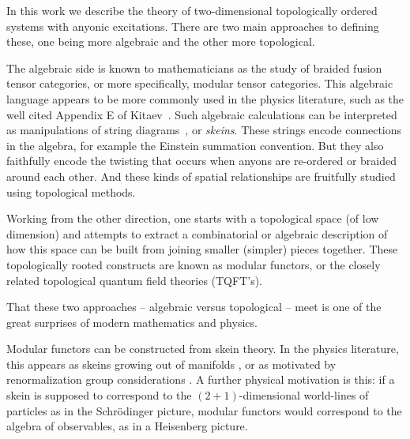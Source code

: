 \documentclass[aps, tightenlines, letterpaper, onecolumn, superscriptaddress, notitlepage, 11pt, groupedaddress]{revtex4-1}
\begin{document}
%
%



In this work we describe the theory of two-dimensional topologically ordered systems
with anyonic excitations. 
There are two main approaches to defining these,
one being more algebraic and the other more topological.

The algebraic side is known to mathematicians as the study of braided
fusion tensor categories, or more specifically, modular tensor categories.
This algebraic language appears to be more commonly used 
in the physics literature, such as the well cited Appendix E of Kitaev~\cite{Kitaev2006}.
Such algebraic calculations can be interpreted as
manipulations of string diagrams~\cite{Baez2010},
or \emph{skeins}.
These strings encode connections in the algebra, for example 
the Einstein summation convention. But they also faithfully
encode the twisting that occurs when anyons are re-ordered or
braided around each other. And these kinds of spatial relationships
are fruitfully studied using topological methods.

Working from the other direction, one starts with
a topological space (of low dimension) and attempts
to extract a combinatorial or algebraic description of how this
space can be built from joining smaller (simpler) pieces together.
These topologically rooted constructs are known as modular functors, 
or the closely related topological quantum field theories (TQFT's).

That these two approaches -- algebraic versus topological -- meet is one of the great
surprises of modern mathematics and physics.


Modular functors can be constructed from skein theory.
In the physics literature, 
this appears as skeins growing out of manifolds \cite{Pfeifer2012},
or as motivated by renormalization group considerations \cite{Levin2005}.
A further physical motivation is this: if a skein 
is supposed to correspond to the $(2+1)$-dimensional
world-lines of particles
as in the Schr\"{o}dinger picture,
modular functors would
correspond to the algebra of observables, as in
a Heisenberg picture.
\end{document}
